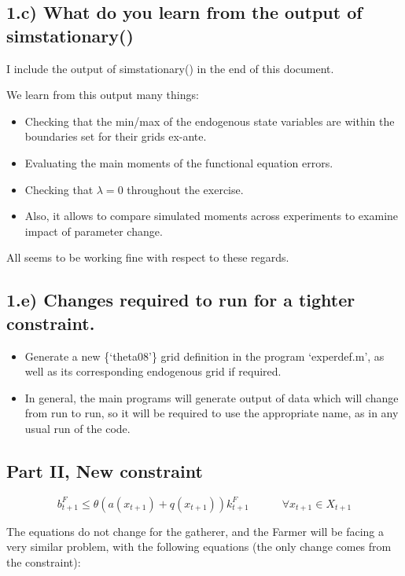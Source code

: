 \documentclass{article}
\begin{document}
\subsection*{1.c) What do you learn from the output of sim\textunderscore stationary()}

I include the output of sim\textunderscore stationary() in the end of this document.

We learn from this output many things:

\begin{itemize}
	\item Checking that the min/max of the endogenous state variables are within the boundaries set for their grids ex-ante.
	\item Evaluating the main moments of the functional equation errors.
	\item Checking that $\lambda = 0$ throughout the exercise.
	\item Also, it allows to compare simulated moments across experiments to examine impact of parameter change.
\end{itemize}

All seems to be working fine with respect to these regards.

\subsection*{1.e) Changes required to run for a tighter constraint.}

\begin{itemize}
	\item Generate a new \{`theta08'\} grid definition in the program `experdef.m', as well as its corresponding endogenous grid if required.
	\item In general, the main programs will generate output of data which will change from run to run, so it will be required to use the appropriate name, as in any usual run of the code.
\end{itemize}


\subsection*{Part II, New constraint}

$$b_{t+1}^F \leq \theta \left( a(x_{t+1}) + q(x_{t+1}) \right)k_{t+1}^F  \quad \quad \quad \forall x_{t+1} \in X_{t+1} $$


The equations do not change for the gatherer, and the Farmer will be facing a very similar problem, with the following equations (the only change comes from the constraint):
\end{document}
